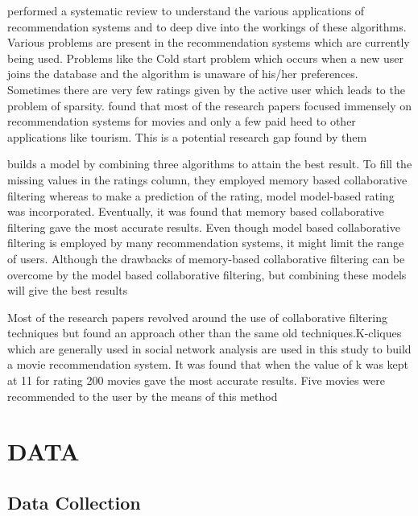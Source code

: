 \documentclass[a4paper,10pt]{article}
\begin{document}
\vspace{3pt}

\cite{roy2022} performed a systematic review to understand the various applications of recommendation systems and to deep dive into the workings of these algorithms. Various problems are present in the recommendation systems which are currently being used. Problems like the Cold start problem which occurs when a new user joins the database and the algorithm is unaware of his/her preferences. Sometimes there are very few ratings given by the active user which leads to the problem of sparsity. \cite{roy2022} found that most of the research papers focused immensely on recommendation systems for movies and only a few paid heed to other applications like tourism. This is a potential research gap found by them

\vspace{4pt}

\cite{5232419} builds a model by combining three algorithms to attain the best result. To fill the missing values in the ratings column, they employed memory based collaborative filtering whereas to make a prediction of the rating, model model-based rating was incorporated. Eventually, it was found that memory based collaborative filtering gave the most accurate results. Even though model based collaborative filtering is employed by many recommendation systems, it might limit the range of users. Although the drawbacks of memory-based collaborative filtering can be overcome by the model based collaborative filtering, but combining these models will give the best results


\vspace{4pt}

Most of the research papers revolved around the use of collaborative filtering techniques but \cite{vilakone2018} found an approach other than the same old techniques.K-cliques which are generally used in social network analysis are used in this study to build a movie recommendation system. It was found that when the value of k was kept at 11 for rating 200 movies gave the most accurate results. Five movies were recommended to the user by the means of this method


\section{DATA}

\subsection{Data Collection}
\end{document}
